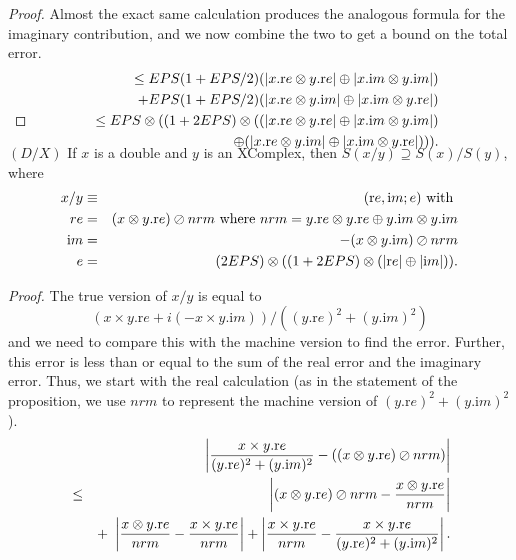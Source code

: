 \begin{proof}{}
Almost the exact same calculation produces the analogous formula for the imaginary contribution, and we now combine the
two to get a bound on the total error.  
\begin{eqnarray*}
&&\le EPS (1 + EPS/2) (|x.{\mathrm re} \otimes y.{\mathrm re}| \oplus |x.{\mathrm im} \otimes y.{\mathrm im}|) \\
&&\quad +
EPS (1 + EPS/2) (|x.{\mathrm re} \otimes y.{\mathrm im}| \oplus |x.{\mathrm im} \otimes y.{\mathrm re}| )\\
&&\le EPS \otimes ((1 +
2EPS)\otimes((|x.{\mathrm re} \otimes y.{\mathrm re}| \oplus |x.{\mathrm im} \otimes y.{\mathrm im}| ) \\
&&\quad \oplus
(|x.{\mathrm re} \otimes y.{\mathrm im}| \oplus |x.{\mathrm im} \otimes y.{\mathrm re}| ))).
\\
\noalign{\vskip-36pt}
\end{eqnarray*}
\end{proof}

\begin{proposition}\label{GMT prop7.11}{$(D / X)$}
If $x$ is a double and $y$ is an {\textrm XComplex,} then
$S(x / y) \supseteq S(x) / S(y)${\textrm ,} where
\begin{eqnarray*}
x  / y & \equiv& ({\mathrm re},{\mathrm im};e)\hbox{ with }\\
re& =& (x  \otimes y.{\mathrm re})\oslash nrm \hbox{ where $nrm = y.{\mathrm re} \otimes y.{\mathrm re} \oplus y.{\mathrm im} \otimes
y.{\mathrm im}$}
\\
{\mathrm im} &=& -(x  \otimes y.{\mathrm im}) \oslash nrm\\
e& =& (2EPS) \otimes ((1 +  2EPS)\otimes(|{\mathrm re}| \oplus |{\mathrm im}|)).
\end{eqnarray*}
\end{proposition}

\noindent\emph{Proof.}
The true version of $x/y$ is equal to  
$$(x \times y.{\mathrm re} + i (-x \times y.{\mathrm im}))/ ((y.{\mathrm re})^2 + (y.{\mathrm im})^2)$$ and we need to compare this with the
machine version to find the error.  Further, this error is less than or equal to the sum of the real error and the imaginary
error. Thus, we start with the real calculation (as in the statement of the proposition, we use $nrm$ to represent the
machine version of $(y.{\mathrm re})^2 + (y.{\mathrm im})^2$).
\begin{eqnarray*}
&&\hskip-36pt \left|{x \times y.{\mathrm re}  \over (y.{\mathrm re})^2 + (y.{\mathrm im})^2} - ((x \otimes y.{\mathrm re})\oslash
nrm)\right|\\
&
\le &\left|(x
\otimes y.{\mathrm re}) \oslash nrm - {x \otimes y.{\mathrm re} \over nrm}\right|\\
&& +\ \left|{x \otimes y.{\mathrm re} \over nrm} - {x
\times y.{\mathrm re}
\over nrm}\right| + \left|{x \times y.{\mathrm re} \over nrm} - 
{x \times y.{\mathrm re}  \over (y.{\mathrm re})^2 + (y.{\mathrm im})^2}\right|.
\end{eqnarray*}
 
